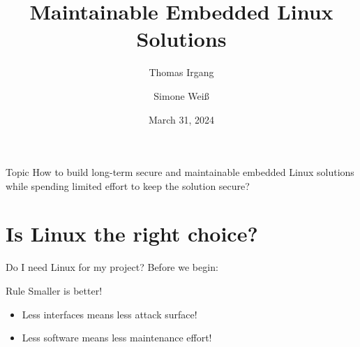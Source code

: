 \documentclass{beamer}
\title{Maintainable Embedded Linux Solutions}
\author{Thomas Irgang \and Simone Weiß}
\institute{EASTERHEGG 2024 - RABBIT PROTOTYPING}
\date{March 31, 2024}
\begin{document}
\begin{frame}
    \titlepage
\end{frame}

\begin{frame}
	\begin{block}{Topic}
		How to build long-term secure and maintainable embedded Linux solutions
		while spending limited effort to keep the solution secure?
	\end{block}
\end{frame}

\section{Is Linux the right choice?}

\begin{frame}{Do I need Linux for my project?}
	Before we begin:

	\begin{block}{Rule}
		Smaller is better!
	\end{block}
	
	\begin{itemize}
		\item Less interfaces means less attack surface!
		\item Less software means less maintenance effort!
	\end{itemize}
\end{frame}
\end{document}
